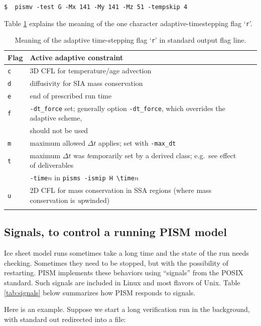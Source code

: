 \documentclass[11pt,final]{amsart}
\begin{document}
\verb|$  pismv -test G -Mx 141 -My 141 -Mz 51 -tempskip 4|

Table \ref{tab:adaptiveflag} explains the meaning of the one character adaptive-timestepping flag `\verb|r|'.

\begin{table}[ht]
\caption{Meaning of the adaptive time-stepping flag `\texttt{r}' in standard output flag line.}\label{tab:adaptiveflag}
\begin{tabular}{@{}llll}\hline
\textbf{Flag} & \textbf{Active adaptive constraint} \\ \hline
\verb|c| & 3D CFL for temperature/age advection \cite{BBL} \\
\verb|d| & diffusivity for SIA mass conservation \cite{BBL} \\
\verb|e| & end of prescribed run time \\
\verb|f| & \verb|-dt_force| set; generally option \verb|-dt_force|, which overrides the adaptive scheme, \\
 & should not be used  \\
\verb|m| & maximum allowed $\Delta t$ applies; set with \verb|-max_dt| \\
\verb|t| & maximum $\Delta t$ was \emph{t}emporarily set by a derived class; e.g.~see effect of deliverables \\
 & \verb|-time|$n$ in \verb|pisms -ismip H \time|$n$ \\
\verb|u| & 2D CFL for mass conservation in SSA regions (where mass conservation is \emph{u}pwinded)\\
\hline
\normalsize
\end{tabular}
\end{table}


\subsection{Signals, to control a running PISM model} \label{subsect:signal}    Ice sheet model runs sometimes take a long time and the state of the run needs checking.  Sometimes they need to be stopped, but with the possibility of restarting.  PISM implements these behaviors using ``signals'' from the POSIX standard.  Such signals are included in Linux and most flavors of Unix.  Table \ref{tab:signals} below summarizes how PISM responds to signals.

Here is an example.  Suppose we start a long verification run in the background, with standard out redirected into a file:
\end{document}
